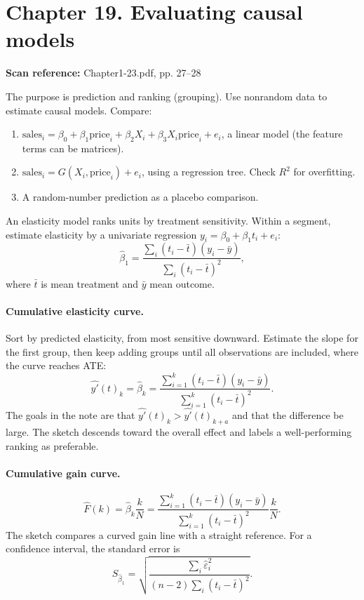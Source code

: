 \documentclass[11pt,a4paper]{article}
\newcommand{\sourcepages}[1]{\par{\small\sffamily\color{muted}\textbf{Scan reference:} #1\par}\nobreak\smallskip\nopagebreak[4]}
\begin{document}
{\section{Chapter 19. Evaluating causal models}
\sourcepages{Chapter1-23.pdf, pp. 27--28}
The purpose is prediction and ranking (grouping). Use nonrandom data to estimate causal models. Compare:
\begin{enumerate}
\item $\mathrm{sales}_i=\beta_0+\beta_1\mathrm{price}_i+\beta_2X_i+\beta_3X_i\mathrm{price}_i+e_i$, a linear model (the feature terms can be matrices).
\item $\mathrm{sales}_i=G(X_i,\mathrm{price}_i)+e_i$, using a regression tree. Check $R^2$ for overfitting.
\item A random-number prediction as a placebo comparison.
\end{enumerate}
An elasticity model ranks units by treatment sensitivity. Within a segment, estimate elasticity by a univariate regression $y_i=\beta_0+\beta_1t_i+e_i$:
\[\hat\beta_1=\frac{\sum_i(t_i-\bar t)(y_i-\bar y)}{\sum_i(t_i-\bar t)^2},\]
where $\bar t$ is mean treatment and $\bar y$ mean outcome.

\paragraph{Cumulative elasticity curve.}
Sort by predicted elasticity, from most sensitive downward. Estimate the slope for the first group, then keep adding groups until all observations are included, where the curve reaches ATE:
\[\widehat{y'}(t)_k=\hat\beta_k=
\frac{\sum_{i=1}^{k}(t_i-\bar t)(y_i-\bar y)}{\sum_{i=1}^{k}(t_i-\bar t)^2}.\]
The goals in the note are that $\widehat{y'}(t)_k>\widehat{y'}(t)_{k+a}$ and that the difference be large. The sketch descends toward the overall effect and labels a well-performing ranking as preferable.

\paragraph{Cumulative gain curve.}
\[\widehat F(k)=\hat\beta_k\frac{k}{N}
=\frac{\sum_{i=1}^{k}(t_i-\bar t)(y_i-\bar y)}{\sum_{i=1}^{k}(t_i-\bar t)^2}\frac{k}{N}.\]
The sketch compares a curved gain line with a straight reference. For a confidence interval, the standard error is
\[S_{\hat\beta_1}=\sqrt{\frac{\sum_i\hat\varepsilon_i^2}{(n-2)\sum_i(t_i-\bar t)^2}}.\]

\begin{center}
\begin{tikzpicture}[>=Stealth, font=\small, line width=.65pt]


\end{tikzpicture}
\end{center}}
\end{document}
